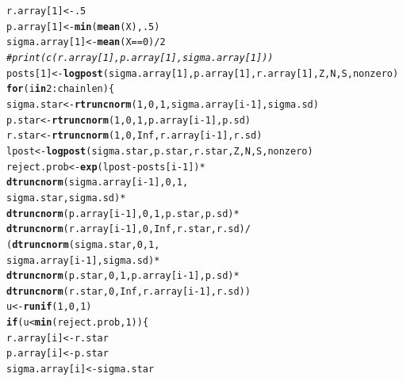 \documentclass{article}\usepackage[]{graphicx}\usepackage[]{color}
\makeatletter
\newcommand{\hlnum}[1]{\textcolor[rgb]{0.686,0.059,0.569}{#1}}%
\newcommand{\hlcom}[1]{\textcolor[rgb]{0.678,0.584,0.686}{\textit{#1}}}%
\newcommand{\hlopt}[1]{\textcolor[rgb]{0,0,0}{#1}}%
\newcommand{\hlstd}[1]{\textcolor[rgb]{0.345,0.345,0.345}{#1}}%
\newcommand{\hlkwa}[1]{\textcolor[rgb]{0.161,0.373,0.58}{\textbf{#1}}}%
\newcommand{\hlkwb}[1]{\textcolor[rgb]{0.69,0.353,0.396}{#1}}%
\newcommand{\hlkwd}[1]{\textcolor[rgb]{0.737,0.353,0.396}{\textbf{#1}}}%
\newenvironment{kframe}{%
 \def\at@end@of@kframe{}%
 \ifinner\ifhmode%
  \def\at@end@of@kframe{\end{minipage}}%
  \begin{minipage}{\columnwidth}%
 \fi\fi%
 \def\FrameCommand##1{\hskip\@totalleftmargin \hskip-\fboxsep
 \colorbox{shadecolor}{##1}\hskip-\fboxsep
     \hskip-\linewidth \hskip-\@totalleftmargin \hskip\columnwidth}%
 \MakeFramed {\advance\hsize-\width
   \@totalleftmargin\z@ \linewidth\hsize
   \@setminipage}}%
 {\par\unskip\endMakeFramed%
 \at@end@of@kframe}
\newenvironment{knitrout}{}{} %
\makeatother
\begin{document}
\begin{knitrout}
\begin{kframe}
\begin{alltt}
  \hlstd{r.array[}\hlnum{1}\hlstd{]} \hlkwb{<-} \hlnum{.5}
  \hlstd{p.array[}\hlnum{1}\hlstd{]} \hlkwb{<-} \hlkwd{min}\hlstd{(}\hlkwd{mean}\hlstd{(X),} \hlnum{.5}\hlstd{)}
  \hlstd{sigma.array[}\hlnum{1}\hlstd{]} \hlkwb{<-} \hlkwd{mean}\hlstd{(X}\hlopt{==}\hlnum{0}\hlstd{)}\hlopt{/}\hlnum{2}
  \hlcom{#print(c(r.array[1], p.array[1], sigma.array[1]))}
  \hlstd{posts[}\hlnum{1}\hlstd{]} \hlkwb{<-} \hlkwd{logpost}\hlstd{(sigma.array[}\hlnum{1}\hlstd{], p.array[}\hlnum{1}\hlstd{], r.array[}\hlnum{1}\hlstd{], Z, N, S, nonzero)}
  \hlkwa{for}\hlstd{(i} \hlkwa{in} \hlnum{2}\hlopt{:}\hlstd{chainlen)\{}
    \hlstd{sigma.star} \hlkwb{<-} \hlkwd{rtruncnorm}\hlstd{(}\hlnum{1}\hlstd{,} \hlnum{0}\hlstd{,} \hlnum{1}\hlstd{, sigma.array[i}\hlopt{-}\hlnum{1}\hlstd{], sigma.sd)}
    \hlstd{p.star} \hlkwb{<-} \hlkwd{rtruncnorm}\hlstd{(}\hlnum{1}\hlstd{,} \hlnum{0}\hlstd{,} \hlnum{1}\hlstd{, p.array[i}\hlopt{-}\hlnum{1}\hlstd{], p.sd)}
    \hlstd{r.star} \hlkwb{<-} \hlkwd{rtruncnorm}\hlstd{(}\hlnum{1}\hlstd{,} \hlnum{0}\hlstd{,} \hlnum{Inf}\hlstd{, r.array[i}\hlopt{-}\hlnum{1}\hlstd{], r.sd)}
    \hlstd{lpost} \hlkwb{<-}\hlkwd{logpost}\hlstd{(sigma.star, p.star, r.star, Z, N, S, nonzero)}
    \hlstd{reject.prob} \hlkwb{<-} \hlkwd{exp}\hlstd{(lpost}\hlopt{-}\hlstd{posts[i}\hlopt{-}\hlnum{1}\hlstd{])}\hlopt{*}
                   \hlkwd{dtruncnorm}\hlstd{(sigma.array[i}\hlopt{-}\hlnum{1}\hlstd{],} \hlnum{0}\hlstd{,} \hlnum{1}\hlstd{,}
                              \hlstd{sigma.star, sigma.sd)}\hlopt{*}
                   \hlkwd{dtruncnorm}\hlstd{(p.array[i}\hlopt{-}\hlnum{1}\hlstd{],} \hlnum{0}\hlstd{,} \hlnum{1}\hlstd{, p.star, p.sd)}\hlopt{*}
                   \hlkwd{dtruncnorm}\hlstd{(r.array[i}\hlopt{-}\hlnum{1}\hlstd{],} \hlnum{0}\hlstd{,} \hlnum{Inf}\hlstd{, r.star, r.sd)}\hlopt{/}
                  \hlstd{(}\hlkwd{dtruncnorm}\hlstd{(sigma.star,} \hlnum{0}\hlstd{,} \hlnum{1}\hlstd{,}
                              \hlstd{sigma.array[i}\hlopt{-}\hlnum{1}\hlstd{], sigma.sd)}\hlopt{*}
                     \hlkwd{dtruncnorm}\hlstd{(p.star,} \hlnum{0}\hlstd{,} \hlnum{1}\hlstd{, p.array[i}\hlopt{-}\hlnum{1}\hlstd{], p.sd)}\hlopt{*}
                     \hlkwd{dtruncnorm}\hlstd{(r.star,} \hlnum{0}\hlstd{,} \hlnum{Inf}\hlstd{, r.array[i}\hlopt{-}\hlnum{1}\hlstd{], r.sd))}
    \hlstd{u} \hlkwb{<-} \hlkwd{runif}\hlstd{(}\hlnum{1}\hlstd{,}\hlnum{0}\hlstd{,}\hlnum{1}\hlstd{)}
    \hlkwa{if}\hlstd{(u} \hlopt{<} \hlkwd{min}\hlstd{(reject.prob,} \hlnum{1}\hlstd{))\{}
      \hlstd{r.array[i]} \hlkwb{<-} \hlstd{r.star}
      \hlstd{p.array[i]} \hlkwb{<-} \hlstd{p.star}
      \hlstd{sigma.array[i]} \hlkwb{<-} \hlstd{sigma.star}

\end{alltt}
\end{kframe}
\end{knitrout}
\end{document}
